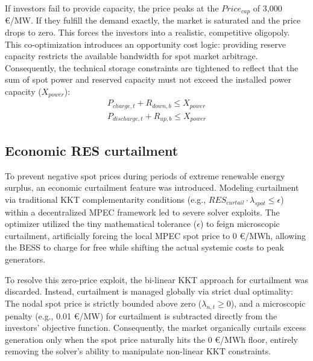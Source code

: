 If investors fail to provide capacity, the price peaks at the $Price_{cap}$ of 3,000 €/MW. If they fulfill the demand exactly, the market is saturated and the price drops to zero. This forces the investors into a realistic, competitive oligopoly. This co-optimization introduces an opportunity cost logic: providing reserve capacity restricts the available bandwidth for spot market arbitrage. Consequently, the technical storage constraints are tightened to reflect that the sum of spot power and reserved capacity must not exceed the installed power capacity (\(X_{power}\)): 
\begin{equation}
    \begin{split}
        P_{charge, t} + R_{down, b} \le X_{power} \\
        P_{discharge, t} + R_{up, b} \le X_{power}
    \end{split}
\end{equation}

\subsection{Economic RES curtailment} \label{subsect:Curtailment}
To prevent negative spot prices during periods of extreme renewable energy surplus, an economic curtailment feature was introduced. Modeling curtailment via traditional KKT complementarity conditions (e.g., $RES_{curtail} \cdot \lambda_{spot} \le \epsilon$) within a decentralized MPEC framework led to severe solver exploits. The optimizer utilized the tiny mathematical tolerance ($\epsilon$) to feign microscopic curtailment, artificially forcing the local MPEC spot price to 0 €/MWh, allowing the BESS to charge for free while shifting the actual systemic costs to peak generators.

To resolve this zero-price exploit, the bi-linear KKT approach for curtailment was discarded. Instead, curtailment is managed globally via strict dual optimality: The nodal spot price is strictly bounded above zero ($\lambda_{n,t} \ge 0$), and a microscopic penalty (e.g., 0.01 €/MW) for curtailment is subtracted directly from the investors' objective function. Consequently, the market organically curtails excess generation only when the spot price naturally hits the 0 €/MWh floor, entirely removing the solver's ability to manipulate non-linear KKT constraints.

